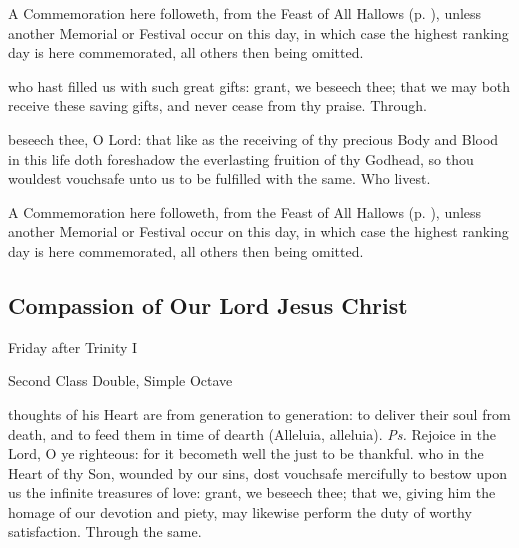 \begin{rubric}
	A Commemoration  here followeth, from the Feast of All Hallows (p. \pageref{AllHallowsSecret}), unless another Memorial or Festival occur on this day, in which case the highest ranking day is here commemorated, all others then being omitted.
\end{rubric}


\postcommunion
{} who hast filled us with such great gifts: grant, we beseech thee; that we may both receive these saving gifts, and never cease from thy praise. Through.

 beseech thee, O Lord: that like as the receiving of thy precious Body and Blood in this life doth foreshadow the everlasting fruition of thy Godhead, so thou wouldest vouchsafe unto us to be fulfilled with the same. Who livest.

\begin{rubric}
	A Commemoration  here followeth, from the Feast of All Hallows (p. \pageref{AllHallowsPostcommunion}), unless another Memorial or Festival occur on this day, in which case the highest ranking day is here commemorated, all others then being omitted.
\end{rubric}


\clearpage
\subsection{Compassion of Our Lord Jesus Christ}
\begin{inhead}
	{Friday after Trinity I}\par
    {Second Class Double, Simple Octave}
\end{inhead}

\introit
{} thoughts of his Heart are from generation to generation: to deliver their soul from death, and to feed them in time of dearth (Alleluia, alleluia). \textit{Ps.} Rejoice in the Lord, O ye righteous: for it becometh well the just to be thankful.
\collect
{} who in the Heart of thy Son, wounded by our sins, dost vouchsafe mercifully to bestow upon us the infinite treasures of love: grant, we beseech thee; that we, giving him the homage of our devotion and piety, may likewise perform the duty of worthy satisfaction. Through the same.

